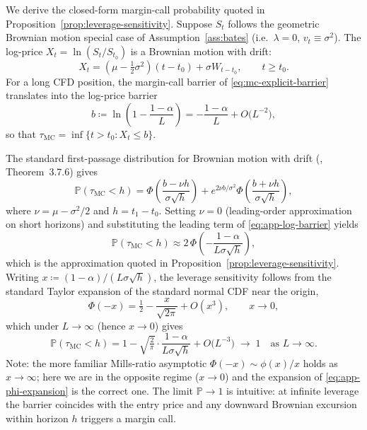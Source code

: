 \documentclass[preprint,12pt,authoryear]{elsarticle}
\newcommand{\PP}{\mathbb{P}}
\theoremstyle{definition}
\begin{document}
We derive the closed-form margin-call probability quoted in
Proposition~\ref{prop:leverage-sensitivity}. Suppose $S_t$
follows the geometric Brownian motion special case of
Assumption~\ref{ass:bates} (i.e.\ $\lambda = 0$,
$v_t \equiv \sigma^{2}$). The log-price
$X_t = \ln(S_t / S_{t_0})$ is a Brownian motion with drift:
\begin{equation}
    X_t = \left( \mu - \tfrac{1}{2}\sigma^{2} \right)(t - t_0)
          + \sigma W_{t - t_0},
    \qquad t \geq t_0.
    \label{eq:app-log-price-bm}
\end{equation}
For a long CFD position, the margin-call barrier of
\eqref{eq:mc-explicit-barrier} translates into the log-price
barrier
\begin{equation}
    b \coloneqq \ln\!\left( 1 - \frac{1 - \alpha}{L} \right)
    = -\frac{1 - \alpha}{L} + O\!\bigl( L^{-2} \bigr),
    \label{eq:app-log-barrier}
\end{equation}
so that $\tau_{\text{MC}} = \inf\{ t > t_0 : X_t \leq b \}$.

The standard first-passage distribution for Brownian motion with
drift (\citealp{Shreve2004}, Theorem~3.7.6) gives
\begin{equation}
    \PP(\tau_{\text{MC}} < h)
    = \Phi\!\left( \frac{b - \nu h}{\sigma \sqrt{h}} \right)
    + e^{2 \nu b / \sigma^{2}}
      \Phi\!\left( \frac{b + \nu h}{\sigma \sqrt{h}} \right),
    \label{eq:app-first-passage}
\end{equation}
where $\nu = \mu - \sigma^{2}/2$ and $h = t_1 - t_0$. Setting
$\nu = 0$ (leading-order approximation on short horizons) and
substituting the leading term of \eqref{eq:app-log-barrier}
yields
\begin{equation}
    \PP(\tau_{\text{MC}} < h)
    \approx 2\, \Phi\!\left(
      -\frac{1 - \alpha}{L \sigma \sqrt{h}}
    \right),
    \label{eq:app-mc-approx}
\end{equation}
which is the approximation quoted in
Proposition~\ref{prop:leverage-sensitivity}. Writing
$x \coloneqq (1-\alpha)/(L\sigma\sqrt{h})$, the leverage
sensitivity follows from the standard Taylor expansion of the
standard normal CDF near the origin,
\begin{equation}
    \Phi(-x) = \tfrac{1}{2} - \frac{x}{\sqrt{2\pi}}
             + O(x^3), \qquad x \to 0,
    \label{eq:app-phi-expansion}
\end{equation}
which under $L \to \infty$ (hence $x \to 0$) gives
\begin{equation}
    \PP(\tau_{\text{MC}} < h)
    = 1 - \sqrt{\tfrac{2}{\pi}}
        \cdot \frac{1 - \alpha}{L \sigma \sqrt{h}}
      + O\!\bigl( L^{-3} \bigr)
    \;\longrightarrow\; 1 \quad \text{as } L \to \infty.
    \label{eq:app-mc-scaling}
\end{equation}
Note: the more familiar Mills-ratio asymptotic
$\Phi(-x) \sim \phi(x)/x$ holds as $x \to \infty$; here we are in
the opposite regime ($x \to 0$) and the expansion of
\eqref{eq:app-phi-expansion} is the correct one. The limit
$\PP \to 1$ is intuitive: at infinite leverage the barrier
coincides with the entry price and any downward Brownian
excursion within horizon $h$ triggers a margin call.
\end{document}
